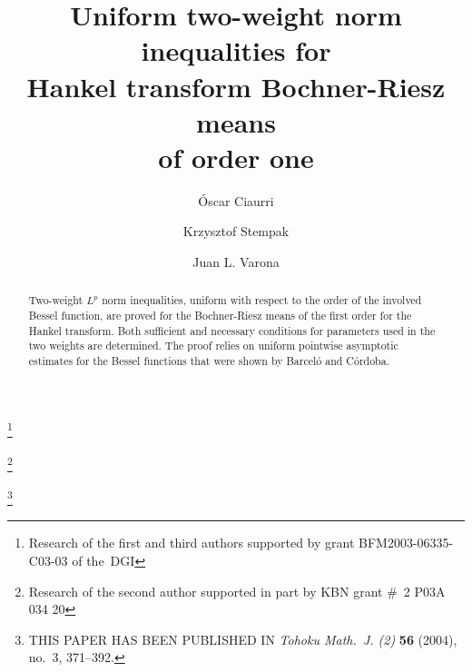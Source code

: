\documentclass[leqno,a4paper]{amsart}
\begin{document}

\title[Uniform two-weight norm inequalities]{Uniform two-weight
norm inequalities for\\ Hankel transform Bochner-Riesz means\\
of order one}

\author[\'O. Ciaurri]{\'Oscar Ciaurri}
\address{Departamento de Matem\'aticas y Computaci\'on,
Universidad de La Rioja,
Calle Luis de Ulloa s/n,
26004 Logro\~no, Spain}

\thanks{Research of the first and third authors supported by grant
BFM2003-06335-C03-03 of the~DGI}

\author[K. Stempak]{Krzysztof Stempak}
\address{Instytut Matematyki,
Politechnika Wroc\l{a}wska,
Wyb.~Wyspia\'nskiego 27,
50-370 Wro\-c\l{a}w,
Poland}

\author[J. L. Varona]{Juan L. Varona}

\address{Departamento de Matem\'aticas y Computaci\'on,
Universidad de La Rioja,
Calle Luis de Ulloa s/n,
26004 Logro\~no, Spain}



\thanks{Research of the second author supported in part by KBN grant
\#~2 P03A 034 20}

\thanks{THIS PAPER HAS BEEN PUBLISHED IN
\textit{Tohoku Math.\ J. (2)} \textbf{56} (2004), no.~3, 371--392.}

\begin{abstract}
Two-weight $L^p$ norm inequalities, uniform with respect to the order of the
involved Bessel function, are proved for the Bochner-Riesz means of the first
order for the Hankel transform. Both sufficient and necessary conditions for
parameters used in the two weights are determined. The proof relies on uniform
pointwise asymptotic estimates for the Bessel functions that were shown by
Barcel\'o and C\'ordoba.
\end{abstract}

\maketitle
\end{document}
